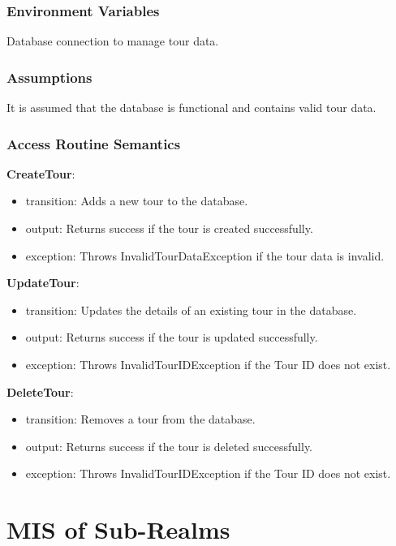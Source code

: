\documentclass[12pt, titlepage]{article}
\begin{document}
\subsubsection{Environment Variables}

Database connection to manage tour data.

\subsubsection{Assumptions}

It is assumed that the database is functional and contains valid tour data.

\subsubsection{Access Routine Semantics}

\noindent \textbf{CreateTour}:
\begin{itemize}
  \item transition: Adds a new tour to the database.
  \item output: Returns success if the tour is created successfully.
  \item exception: Throws InvalidTourDataException if the tour data is invalid.
\end{itemize}

\noindent \textbf{UpdateTour}:
\begin{itemize}
  \item transition: Updates the details of an existing tour in the database.
  \item output: Returns success if the tour is updated successfully.
  \item exception: Throws InvalidTourIDException if the Tour ID does not exist.
\end{itemize}

\noindent \textbf{DeleteTour}:
\begin{itemize}
  \item transition: Removes a tour from the database.
  \item output: Returns success if the tour is deleted successfully.
  \item exception: Throws InvalidTourIDException if the Tour ID does not exist.
\end{itemize}

\newpage

\section{MIS of Sub-Realms} \label{sub-realms}
\end{document}
